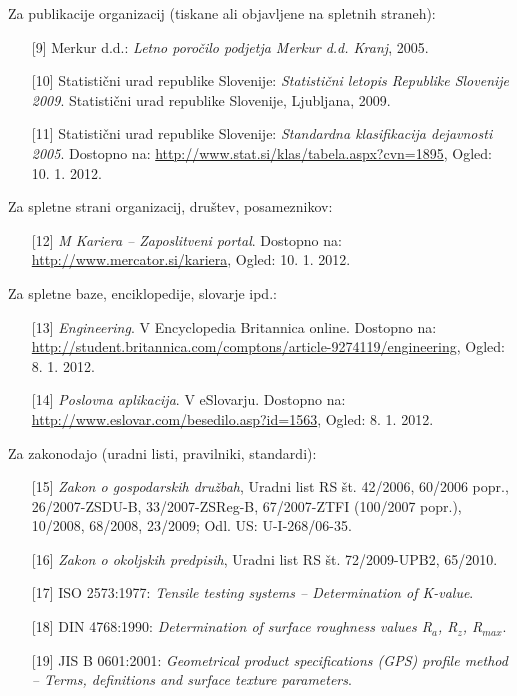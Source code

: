 Za publikacije organizacij (tiskane ali objavljene na spletnih straneh):
\begin{itemize}
\item[{[9]}] {Merkur d.d.}: \emph{Letno poročilo podjetja Merkur d.d. Kranj}, 2005.
\item[{[10]}] {Statistični urad republike Slovenije}: \emph{Statistični letopis Republike
  Slovenije 2009}. Statistični urad republike Slovenije, Ljubljana, 2009.
\item[{[11]}] {Statistični urad republike Slovenije}: \emph{Standardna klasifikacija
  dejavnosti 2005}. Dostopno na:
  \url{http://www.stat.si/klas/tabela.aspx?cvn=1895}, Ogled: 10. 1. 2012.
\end{itemize}

Za spletne strani organizacij, društev, posameznikov:
\begin{itemize}
\item[{[12]}] \emph{M Kariera – Zaposlitveni portal}. Dostopno na:
  \url{http://www.mercator.si/kariera}, Ogled: 10. 1. 2012.
\end{itemize}

Za spletne baze, enciklopedije, slovarje ipd.:
\begin{itemize}
\item[{[13]}] \emph{Engineering}. V Encyclopedia Britannica online. Dostopno na:
  \url{http://student.britannica.com/comptons/article-9274119/engineering},
  Ogled: 8. 1. 2012.
\item[{[14]}] \emph{Poslovna aplikacija}. V eSlovarju. Dostopno na:
  \url{http://www.eslovar.com/besedilo.asp?id=1563}, Ogled: 8. 1. 2012.
\end{itemize}

Za zakonodajo (uradni listi, pravilniki, standardi):
\begin{itemize}
\item[{[15]}] \emph{Zakon o gospodarskih družbah}, {U}radni list RS št. 42/2006, 60/2006
  popr., 26/2007-ZSDU-B, 33/2007-ZSReg-B, 67/2007-ZTFI (100/2007 popr.),
  10/2008, 68/2008, 23/2009; Odl. US: U-I-268/06-35.
\item[{[16]}] \emph{Zakon o okoljskih predpisih}, {U}radni list RS št. 72/2009-UPB2,
  65/2010.
\item[{[17]}] {ISO 2573:1977}: \emph{Tensile testing systems – Determination of K-value}.
\item[{[18]}] {DIN 4768:1990}: \emph{Determination of surface roughness values R$_a$, R$_z$,
  R$_{max}$}.
\item[{[19]}] {JIS B 0601:2001}: \emph{Geometrical product specifications (GPS) profile
  method – Terms, definitions and surface texture parameters}.
\end{itemize}

